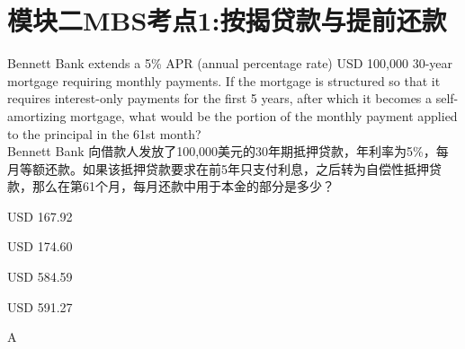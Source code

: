 \documentclass{article}
\newcounter{question} %
\begin{document}
 \tableofcontents %
\newpage




\iftrue
\section{模块二MBS考点1:按揭贷款与提前还款}
\setcounter{question}{0}

\begin{question}
    Bennett Bank extends a 5\% APR (annual percentage rate) USD 100,000 30-year mortgage requiring monthly payments. If the mortgage is structured so that it requires interest-only payments for the first 5 years, after which it becomes a self-amortizing mortgage, what would be the portion of the monthly payment applied to the principal in the 61st month?\\
    Bennett Bank 向借款人发放了100,000美元的30年期抵押贷款，年利率为5\%，每月等额还款。如果该抵押贷款要求在前5年只支付利息，之后转为自偿性抵押贷款，那么在第61个月，每月还款中用于本金的部分是多少？
    \end{question}
    
    \begin{choices}
        \item USD 167.92
        \item USD 174.60
        \item USD 584.59
        \item USD 591.27
    \end{choices}
    
    \begin{correctanswer}
    A
    \end{correctanswer}
    
\end{document}
